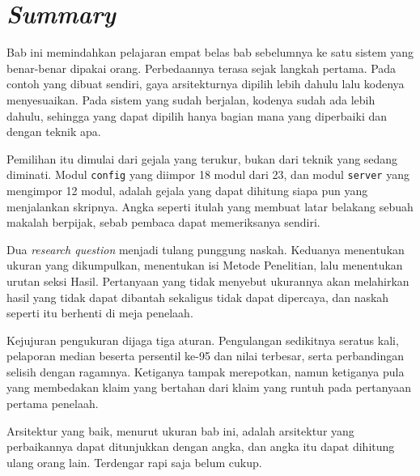 \section{\textit{Summary}}

Bab ini memindahkan pelajaran empat belas bab sebelumnya ke satu sistem yang
benar-benar dipakai orang. Perbedaannya terasa sejak langkah pertama. Pada
contoh yang dibuat sendiri, gaya arsitekturnya dipilih lebih dahulu lalu
kodenya menyesuaikan. Pada sistem yang sudah berjalan, kodenya sudah ada lebih
dahulu, sehingga yang dapat dipilih hanya bagian mana yang diperbaiki dan
dengan teknik apa.

Pemilihan itu dimulai dari gejala yang terukur, bukan dari teknik yang sedang
diminati. Modul \texttt{config} yang diimpor 18 modul dari 23, dan modul
\texttt{server} yang mengimpor 12 modul, adalah gejala yang dapat dihitung
siapa pun yang menjalankan skripnya. Angka seperti itulah yang membuat latar
belakang sebuah makalah berpijak, sebab pembaca dapat memeriksanya sendiri.

Dua \textit{research question} menjadi tulang punggung naskah. Keduanya
menentukan ukuran yang dikumpulkan, menentukan isi Metode Penelitian, lalu
menentukan urutan seksi Hasil. Pertanyaan yang tidak menyebut ukurannya akan
melahirkan hasil yang tidak dapat dibantah sekaligus tidak dapat dipercaya,
dan naskah seperti itu berhenti di meja penelaah.

Kejujuran pengukuran dijaga tiga aturan. Pengulangan sedikitnya seratus kali,
pelaporan median beserta persentil ke-95 dan nilai terbesar, serta
perbandingan selisih dengan ragamnya. Ketiganya tampak merepotkan, namun
ketiganya pula yang membedakan klaim yang bertahan dari klaim yang runtuh pada
pertanyaan pertama penelaah.

Arsitektur yang baik, menurut ukuran bab ini, adalah arsitektur yang
perbaikannya dapat ditunjukkan dengan angka, dan angka itu dapat dihitung ulang
orang lain. Terdengar rapi saja belum cukup.

